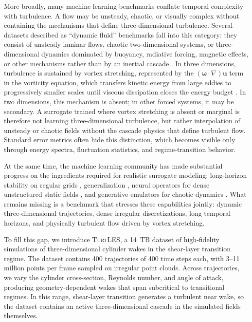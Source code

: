 \documentclass{article}
\begin{document}
More broadly, many machine learning benchmarks conflate temporal complexity with turbulence. A flow may be unsteady, chaotic, or visually complex without containing the mechanisms that define three-dimensional turbulence. Several datasets described as ``dynamic fluid'' benchmarks fall into this category: they consist of unsteady laminar flows, chaotic two-dimensional systems, or three-dimensional dynamics dominated by buoyancy, radiative forcing, magnetic effects, or other mechanisms rather than by an inertial cascade \citep{pfaff2021traditionalcylinder, takamoto2024pdebenchextensivebenchmarkscientific}. In three dimensions, turbulence is sustained by vortex stretching, represented by the $(\boldsymbol{\omega}\cdot\nabla)\mathbf{u}$ term in the vorticity equation, which transfers kinetic energy from large eddies to progressively smaller scales until viscous dissipation closes the energy budget \citep{PopeBook}. In two dimensions, this mechanism is absent; in other forced systems, it may be secondary. A surrogate trained where vortex stretching is absent or marginal is therefore not learning three-dimensional turbulence, but rather interpolation of unsteady or chaotic fields without the cascade physics that define turbulent flow. Standard error metrics often hide this distinction, which becomes visible only through energy spectra, fluctuation statistics, and regime-transition behavior.

At the same time, the machine learning community has made substantial progress on the ingredients required for realistic surrogate modeling: long-horizon stability on regular grids \citep{mccabe2023multiple, lippe2023pde}, generalization \citep{huang2022metaautodecoder, Koupai2024GEPS, subramanian2023towards, takamoto2023learning}, neural operators for dense unstructured static fields \citep{li2023geometry, wen2025goat, luotransolverplus}, and generative emulators for chaotic dynamics \citep{zhou2025reframinggenerativemodelsphysical, pedersen2025thermalizer}. What remains missing is a benchmark that stresses these capabilities jointly: dynamic three-dimensional trajectories, dense irregular discretizations, long temporal horizons, and physically turbulent flow driven by vortex stretching.

To fill this gap, we introduce \textsc{TurtLES}, a \textcolor{revcolor}{14}~TB dataset of high-fidelity simulations of three-dimensional cylinder wakes in the shear-layer transition regime. The dataset contains \textcolor{revcolor}{400} trajectories of 400 time steps each, with \textcolor{revcolor}{3--11} million points per frame sampled on irregular point clouds. Across trajectories, we vary the cylinder cross-section, Reynolds number, and angle of attack, producing geometry-dependent wakes that span subcritical to transitional regimes. In this range, shear-layer transition generates a turbulent near wake, so the dataset contains an active three-dimensional cascade in the simulated fields themselves.
\end{document}
